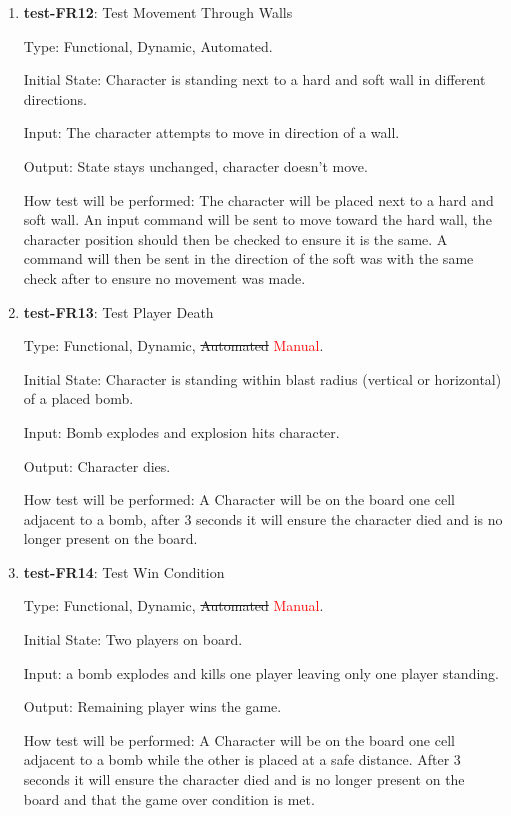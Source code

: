 \documentclass[12pt, titlepage]{article}
\begin{document}
\begin{enumerate}
\item{\textbf{test-FR12}: Test Movement Through Walls\\}

Type: Functional, Dynamic, Automated.
					
Initial State: Character is standing next to a hard and soft wall in different directions.
					
Input: The character attempts to move in direction of a wall.
					
Output: State stays unchanged, character doesn't move.
					
How test will be performed: The character will be placed next to a hard and soft wall. An input command will be sent to move toward the hard wall, the character position should then be checked to ensure it is the same. A command will then be sent in the direction of the soft was with the same check after to ensure no movement was made.

\item{\textbf{test-FR13}: Test Player Death\\} 

Type: Functional, Dynamic, \st{Automated} \textcolor{red}{Manual}.
					
Initial State: Character is standing within blast radius (vertical or horizontal) of a placed bomb.
					
Input: Bomb explodes and explosion hits character.
					
Output: Character dies.
					
How test will be performed: A Character will be on the board one cell adjacent to a bomb, after 3 seconds it will ensure the character died and is no longer present on the board.

\item{\textbf{test-FR14}: Test Win Condition\\}

Type: Functional, Dynamic, \st{Automated} \textcolor{red}{Manual}.
					
Initial State: Two players on board.
					
Input: a bomb explodes and kills one player leaving only one player standing.
					
Output: Remaining player wins the game.
					
How test will be performed: A Character will be on the board one cell adjacent to a bomb while the other is placed at a safe distance. After 3 seconds it will ensure the character died and is no longer present on the board and that the game over condition is met.

\end{enumerate}
\end{document}
